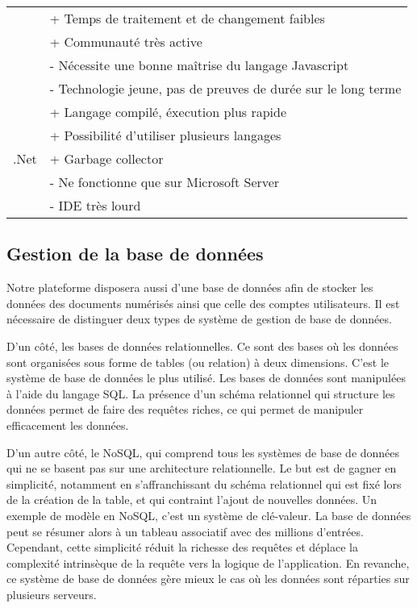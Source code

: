 \begin{tabular}{|l|l|}
                & + Temps de traitement et de changement faibles \\
                & + Communauté très active \\
                & - Nécessite une bonne maîtrise du langage Javascript \\
                & - Technologie jeune, pas de preuves de durée sur le long terme \\ \hline
            \multirow{6}{*}{.Net} & + Langage compilé, éxecution plus rapide \\
                & + Possibilité d'utiliser plusieurs langages \\
                & + Garbage collector \\
                & - Ne fonctionne que sur Microsoft Server \\
                & - IDE très lourd \\ 
            \hline
        \end{tabular}

    \subsection{Gestion de la base de données}
    \label{subsec:bdd}

   Notre plateforme disposera aussi d’une base de données afin de stocker les données des documents numérisés ainsi que celle des comptes utilisateurs. Il est nécessaire de distinguer deux types de système de gestion de base de données.

    D’un côté, les bases de données relationnelles. Ce sont des bases où les données sont organisées sous forme de tables (ou relation) à deux dimensions. C’est le système de base de données le plus utilisé. Les bases de données sont manipulées à l’aide du langage SQL. La présence d’un schéma relationnel qui structure les données permet de faire des requêtes riches, ce qui permet de manipuler efficacement les données.

    D’un autre côté, le NoSQL, qui comprend tous les systèmes de base de données qui ne se basent pas sur une architecture relationnelle. Le but est de gagner en simplicité, notamment en s’affranchissant du schéma relationnel qui est fixé lors de la création de la table, et qui contraint l’ajout de nouvelles données. Un exemple de modèle en NoSQL, c’est un système de clé-valeur. La base de données peut se résumer alors à un tableau associatif avec des millions d’entrées. Cependant, cette simplicité réduit la richesse des requêtes et déplace la complexité intrinsèque de la requête vers la logique de l’application. En revanche, ce système de base de données gère mieux le cas où les données sont réparties sur plusieurs serveurs.


